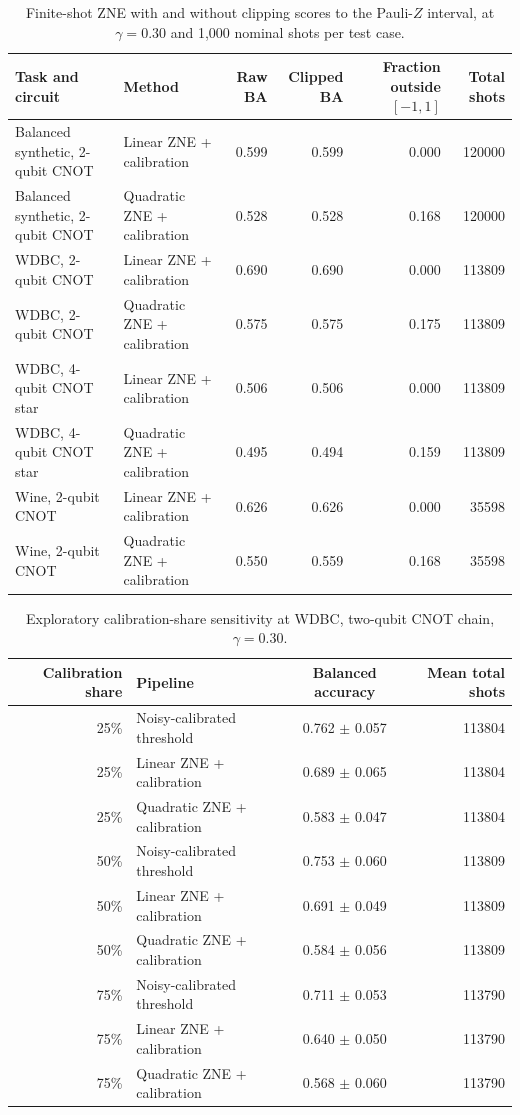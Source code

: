 \documentclass[10pt]{article}
\begin{document}
\begin{table}[H]\centering\scriptsize
\caption{Finite-shot ZNE with and without clipping scores to the Pauli-$Z$ interval, at $\gamma=0.30$ and 1,000 nominal shots per test case.}
\label{tab:zne_range}
\begin{tabular}{@{}l l r r r r@{}}\toprule
Task and circuit & Method & Raw BA & Clipped BA & Fraction outside $[-1,1]$ & Total shots \\
\midrule
Balanced synthetic, 2-qubit CNOT & Linear ZNE + calibration & 0.599 & 0.599 & 0.000 & 120000 \\
Balanced synthetic, 2-qubit CNOT & Quadratic ZNE + calibration & 0.528 & 0.528 & 0.168 & 120000 \\
WDBC, 2-qubit CNOT & Linear ZNE + calibration & 0.690 & 0.690 & 0.000 & 113809 \\
WDBC, 2-qubit CNOT & Quadratic ZNE + calibration & 0.575 & 0.575 & 0.175 & 113809 \\
WDBC, 4-qubit CNOT star & Linear ZNE + calibration & 0.506 & 0.506 & 0.000 & 113809 \\
WDBC, 4-qubit CNOT star & Quadratic ZNE + calibration & 0.495 & 0.494 & 0.159 & 113809 \\
Wine, 2-qubit CNOT & Linear ZNE + calibration & 0.626 & 0.626 & 0.000 & 35598 \\
Wine, 2-qubit CNOT & Quadratic ZNE + calibration & 0.550 & 0.559 & 0.168 & 35598 \\
\bottomrule\end{tabular}\end{table}

\begin{table}[H]\centering\scriptsize
\caption{Exploratory calibration-share sensitivity at WDBC, two-qubit CNOT chain, $\gamma=0.30$.}
\label{tab:allocation}
\begin{tabular}{@{}r l c r@{}}\toprule
Calibration share & Pipeline & Balanced accuracy & Mean total shots \\
\midrule
25\% & Noisy-calibrated threshold & 0.762 $\pm$ 0.057 & 113804 \\
25\% & Linear ZNE + calibration & 0.689 $\pm$ 0.065 & 113804 \\
25\% & Quadratic ZNE + calibration & 0.583 $\pm$ 0.047 & 113804 \\
50\% & Noisy-calibrated threshold & 0.753 $\pm$ 0.060 & 113809 \\
50\% & Linear ZNE + calibration & 0.691 $\pm$ 0.049 & 113809 \\
50\% & Quadratic ZNE + calibration & 0.584 $\pm$ 0.056 & 113809 \\
75\% & Noisy-calibrated threshold & 0.711 $\pm$ 0.053 & 113790 \\
75\% & Linear ZNE + calibration & 0.640 $\pm$ 0.050 & 113790 \\
75\% & Quadratic ZNE + calibration & 0.568 $\pm$ 0.060 & 113790 \\
\bottomrule\end{tabular}\end{table}
\end{document}
